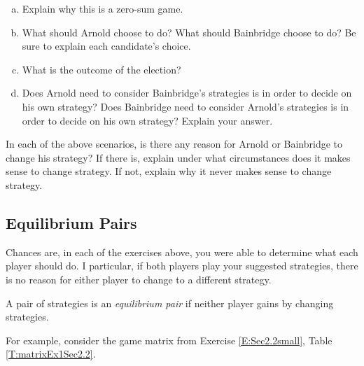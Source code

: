 \begin{xca}
\begin{enumerate}[(a)]
\item Explain why this is a zero-sum game.

\item What should Arnold choose to do? What should Bainbridge choose to do? Be sure to explain each candidate's choice.

\item What is the outcome of the election?
\item Does Arnold need to consider Bainbridge's strategies is in order to decide on his own strategy? Does Bainbridge need to consider Arnold's strategies is in order to decide on his own strategy? Explain your answer.

\end{enumerate}
\end{xca}


\begin{xca}
In each of the above scenarios, is there any reason for Arnold or Bainbridge to change his strategy? If there is, explain under what circumstances does it makes sense to change strategy. If not, explain why it never makes sense to change strategy.
\end{xca}


\vspace{.2in}
\subsection{Equilibrium Pairs}

Chances are, in each of the exercises above, you were able to determine what each player should do. I particular, if both players play your suggested strategies, there is no reason for either player to change to a different strategy.

\begin{definition}\label{D:equilpair} A pair of strategies is an \emph{equilibrium pair} if neither player gains by changing strategies.
\end{definition}


For example, consider the game matrix from Exercise \ref{E:Sec2.2small}, Table \ref{T:matrixEx1Sec2.2}.



